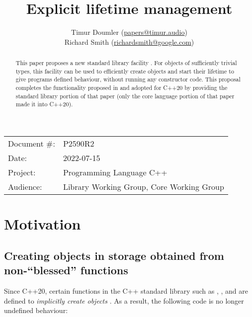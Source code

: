 

\newcommand{\forceindent}{\parindent=1em\indent\parindent=0pt\relax} %


\title{Explicit lifetime management}
\author{
  Timur Doumler \small(\href{mailto:papers@timur.audio}{papers@timur.audio}) \\
  Richard Smith \small(\href{mailto:richardsmith@google.com}{richardsmith@google.com})
}
\date{}
\maketitle

\begin{tabular}{ll}
Document \#: & P2590R2 \\
Date: & 2022-07-15\\
Project: & Programming Language C++ \\
Audience: & Library Working Group, Core Working Group
\end{tabular}


\begin{abstract}
This paper proposes a new standard library facility . For objects of sufficiently trivial types, this facility can be used to efficiently create objects and start their lifetime to give programs defined behaviour, without running any constructor code. This proposal completes the functionality  proposed in \cite{P0593R6} and adopted for C++20 by providing the standard library portion of that paper (only the core language portion of that paper made it into C++20).
\end{abstract}

\section{Motivation}
\label{sec:motivation}

\subsection{Creating objects in storage obtained from non-``blessed'' functions}

Since C++20, certain functions in the C++ standard library such as , , and  are defined to \emph{implicitly create objects} \cite{P0593R6}. As a result, the following code is no longer undefined behaviour:

